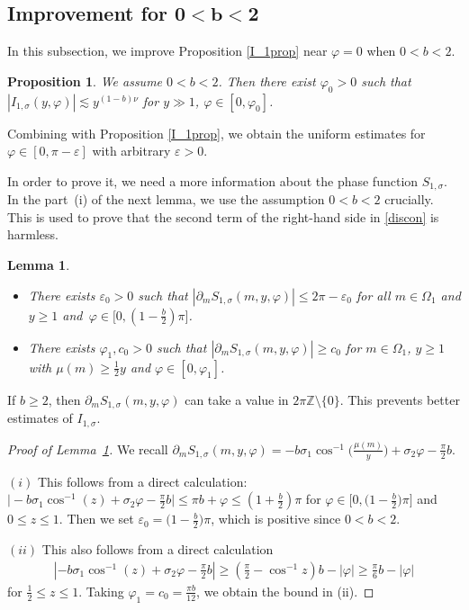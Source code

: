 \documentclass[10pt,a4paper]{article}
\numberwithin{equation}{section}
\newtheorem{Lemma}[Theorem]{Lemma}
\newtheorem{Proposition}[Theorem]{Proposition}
 { \theoremstyle{definition}
\newtheorem{Definition}[Theorem]{Definition}
\newtheorem{Note}[Theorem]{Note}
\newtheorem{Example}[Theorem]{Example}
\newtheorem{Remark}[Theorem]{Remark} }
\def\e{\varepsilon}
\def\f{\varphi}
\def\m{\mu}
\def\n{\nu}
\def\s{\sigma}
\def\pa{\partial}
\begin{document}
\subsection[Improvement for 0<b<2]{Improvement for $\boldsymbol{0<b<2}$}\label{subsec0b2imp}

In this subsection, we improve Proposition \ref{I_1prop} near $\f=0$ when $0<b<2$.

\begin{Proposition}\label{I_1propimp}
We assume $0<b<2$.
Then there exist $\f_0>0$ such that
$
|I_{1,\s}(y,\f)|\lesssim
y^{(1-b)\n}$ for $y\gg 1$, $ \f\in [0,\f_0]$.
\end{Proposition}

\begin{Remark}
Combining with Proposition \ref{I_1prop}, we obtain the uniform estimates for $\f\in [0,\pi-\e]$ with arbitrary $\e>0$.
\end{Remark}

In order to prove it, we need a more information about the phase function $S_{1,\s}$. In the part~(i) of the next lemma, we use the assumption $0<b<2$ crucially. This is used to prove that the second term of the right-hand side in \eqref{discon} is harmless.

\begin{Lemma}\label{S_1implem}\quad
\begin{itemize}
\item[$(i)$]
There exists $\e_0>0$ such that
$
|\pa_mS_{1,\s}(m,y,\f)|\leq 2\pi-\e_0
$
for all $m\in \Omega_1$ and $y\geq 1$ and~${\f\in \bigl[0,(1-\frac{b}{2})\pi\bigr]}$.

\item[$(ii)$] There exists $\f_1,c_0>0$ such that
$
|\pa_mS_{1,\s}(m,y,\f)|\geq c_0
$
for $m\in \Omega_1$, $y\geq 1$ with $\m(m)\geq \frac{1}{2}y$ and $\f\in [0,\f_1]$.
\end{itemize}
\end{Lemma}

\begin{Remark}
If $b\geq 2$, then $\pa_mS_{1,\s}(m,y,\f)$ can take a value in $2\pi \mathbb{Z}\setminus \{0\}$. This prevents better estimates of $I_{1,\s}$.
\end{Remark}

\begin{proof}[Proof of Lemma~\ref{S_1implem}]
We recall $\pa_mS_{1,\s}(m,y,\f)=-b\s_1\cos^{-1}\bigl(\frac{\m(m)}{y}\bigr)+\s_2\f-\frac{\pi}{2}b$.

 $(i)$
This follows from a direct calculation: $\bigl|-b\s_1\cos^{-1}(z)+\s_2\f-\frac{\pi}{2}b\bigr|\leq \pi b+\f\leq (1+\frac{b}{2})\pi$ for $\f\in \bigl[0,\bigl(1-\frac{b}{2}\bigr)\pi\bigr]$ and $0\le z\le 1$. Then we set $\e_0=\bigl(1-\frac{b}{2}\bigr)\pi$, which is positive since $0<b<2$.

 $(ii)$ This also follows from a direct calculation
\begin{align*}
\left|-b\s_1\cos^{-1}(z)+\s_2\f-\frac{\pi}{2}b\right|\geq \left(\frac{\pi}{2}-\cos^{-1}z\right)b- |\f|\geq \frac{\pi}{6}b-|\f|
\end{align*}
for $\frac{1}{2}\leq z\leq 1$. Taking $\f_1=c_0=\frac{\pi b}{12}$, we obtain the bound in (ii).
\end{proof}
\end{document}
